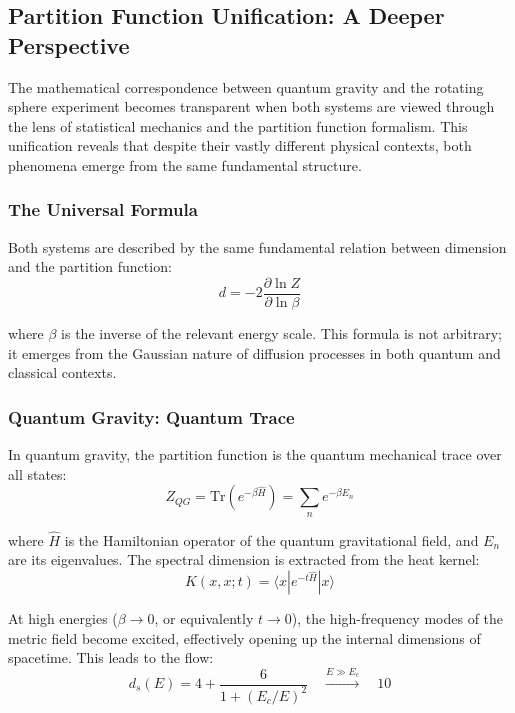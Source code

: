 \documentclass[12pt,a4paper]{article}
\begin{document}
\subsection{Partition Function Unification: A Deeper Perspective}

The mathematical correspondence between quantum gravity and the rotating sphere experiment becomes transparent when both systems are viewed through the lens of statistical mechanics and the partition function formalism. This unification reveals that despite their vastly different physical contexts, both phenomena emerge from the same fundamental structure.

\subsubsection{The Universal Formula}

Both systems are described by the same fundamental relation between dimension and the partition function:
\begin{equation}
    d = -2 \frac{\partial \ln Z}{\partial \ln \beta}
    \label{eq:universal_dimension}
\end{equation}

where $\beta$ is the inverse of the relevant energy scale. This formula is not arbitrary; it emerges from the Gaussian nature of diffusion processes in both quantum and classical contexts.

\subsubsection{Quantum Gravity: Quantum Trace}

In quantum gravity, the partition function is the quantum mechanical trace over all states:
\begin{equation}
    Z_{QG} = \text{Tr}(e^{-\beta \hat{H}}) = \sum_n e^{-\beta E_n}
\end{equation}

where $\hat{H}$ is the Hamiltonian operator of the quantum gravitational field, and $E_n$ are its eigenvalues. The spectral dimension is extracted from the heat kernel:
\begin{equation}
    K(x,x;t) = \langle x | e^{-t\hat{H}} | x \rangle
\end{equation}

At high energies ($\beta \to 0$, or equivalently $t \to 0$), the high-frequency modes of the metric field become excited, effectively opening up the internal dimensions of spacetime. This leads to the flow:
\begin{equation}
    d_s(E) = 4 + \frac{6}{1+(E_c/E)^2} \quad \xrightarrow{E \gg E_c} \quad 10
\end{equation}
\end{document}
